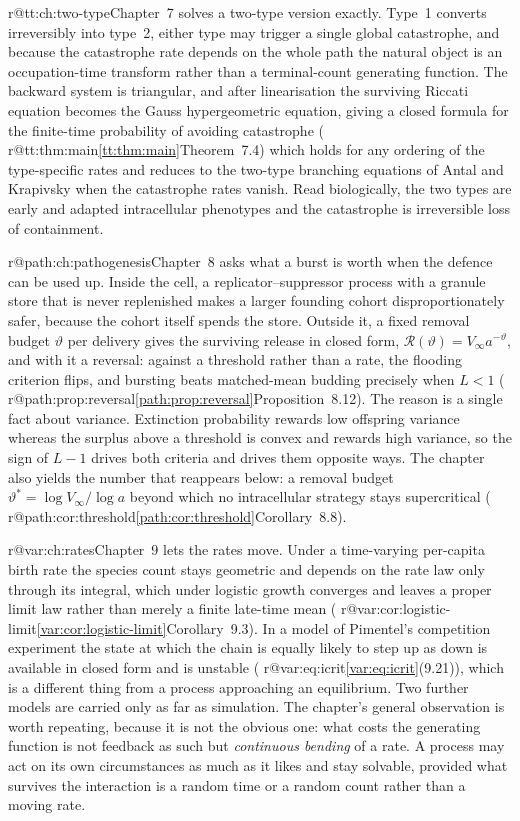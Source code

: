 \documentclass[11pt,a4paper]{report}
\makeatletter
\providecommand{\mextref}[2]{%
  \ifcsname r@#1\endcsname\cref{#1}\else#2\fi}
\providecommand{\Mextref}[2]{%
  \ifcsname r@#1\endcsname\Cref{#1}\else#2\fi}
\theoremstyle{plain}
\theoremstyle{remark}
\makeatother
\begin{document}
\Mextref{tt:ch:two-type}{Chapter~7} solves a two-type version exactly. Type~1
converts irreversibly into type~2, either type may trigger a single global
catastrophe, and because the catastrophe rate depends on the whole path the
natural object is an occupation-time transform rather than a terminal-count
generating function. The backward system is triangular, and after
linearisation the surviving Riccati equation becomes the Gauss hypergeometric
equation, giving a closed formula for the finite-time probability of avoiding
catastrophe (\mextref{tt:thm:main}{Theorem~7.4}) which holds for any ordering
of the type-specific rates and reduces to the two-type branching equations of
Antal and Krapivsky \cite{antal2011exact} when the catastrophe rates vanish.
Read biologically, the two types are early and adapted intracellular
phenotypes and the catastrophe is irreversible loss of containment.

\Mextref{path:ch:pathogenesis}{Chapter~8} asks what a burst is worth when the
defence can be used up. Inside the cell, a replicator--suppressor process
with a granule store that is never replenished makes a larger founding cohort
disproportionately safer, because the cohort itself spends the store. Outside
it, a fixed removal budget $\vartheta$ per delivery gives the surviving
release in closed form, $\mathcal{R}(\vartheta)=V_\infty a^{-\vartheta}$, and
with it a reversal: against a threshold rather than a
rate, the flooding criterion flips, and bursting beats matched-mean budding
precisely when $L<1$ (\mextref{path:prop:reversal}{Proposition~8.12}). The
reason is a single fact about variance. Extinction probability rewards low
offspring variance whereas the surplus above a threshold is convex and
rewards high variance, so the sign of $L-1$ drives both criteria and drives
them opposite ways. The chapter also yields the number that reappears below:
a removal budget $\vartheta^{\ast}=\log V_\infty/\log a$ beyond which no
intracellular strategy stays supercritical
(\mextref{path:cor:threshold}{Corollary~8.8}).

\Mextref{var:ch:rates}{Chapter~9} lets the rates move. Under a
time-varying per-capita birth rate the species count stays geometric and
depends on the rate law only through its integral, which under logistic
growth converges and leaves a proper limit law rather than merely a finite
late-time mean (\mextref{var:cor:logistic-limit}{Corollary~9.3}). In a model
of Pimentel's competition experiment the state at which the chain is equally
likely to step up as down is available in closed form and is unstable
(\mextref{var:eq:icrit}{(9.21)}), which is a different thing from a process
approaching an equilibrium. Two further models are carried only as far as
simulation. The chapter's general observation is worth repeating, because it
is not the obvious one: what costs the generating function is not feedback as
such but \emph{continuous bending} of a rate. A process may act on its own
circumstances as much as it likes and stay solvable, provided what survives
the interaction is a random time or a random count rather than a moving rate.
\end{document}
